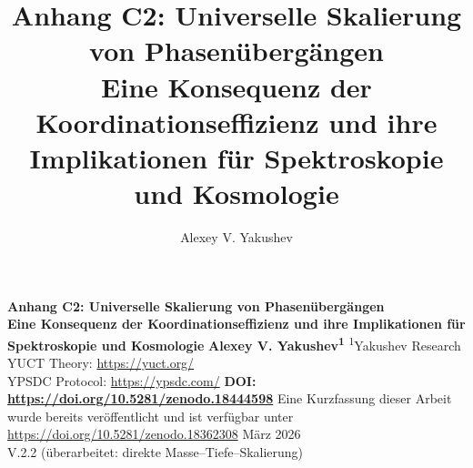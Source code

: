 \documentclass[12pt,a4paper]{article}
\title{Anhang C2: Universelle Skalierung von Phasenübergängen\\
	\large Eine Konsequenz der Koordinationseffizienz und ihre Implikationen für Spektroskopie und Kosmologie}
\author{Alexey V. Yakushev}
\theoremstyle{remark}
\begin{document}
	
	\begin{titlepage}
		\begin{center}
			\vspace*{1cm}
			\Huge\textbf{Anhang C2: Universelle Skalierung von Phasenübergängen} \\
			\vspace{0.5cm}
			\Large\textbf{Eine Konsequenz der Koordinationseffizienz und ihre Implikationen für Spektroskopie und Kosmologie}
			\vspace{1.5cm}
			\Large\textbf{Alexey V. Yakushev\textsuperscript{1}}
			\vspace{0.3cm}
			\large
			\textsuperscript{1}Yakushev Research \\
			YUCT Theory: \url{https://yuct.org/} \\
			YPSDC Protocol: \url{https://ypsdc.com/}
			\vspace{2cm}
			\textbf{DOI: \url{https://doi.org/10.5281/zenodo.18444598}}
			\vspace{1cm}
			\large 
			Eine Kurzfassung dieser Arbeit wurde bereits veröffentlicht und ist verfügbar unter \\
			\url{https://doi.org/10.5281/zenodo.18362308}
			\vspace{1cm}
			März 2026 \\
			\large V.2.2 (überarbeitet: direkte Masse–Tiefe–Skalierung)
			\vspace{2cm}
			\begin{minipage}{0.9\textwidth}
				\begin{abstract}
					\noindent

\end{abstract}
\end{minipage}
\end{center}
\end{titlepage}
\end{document}

